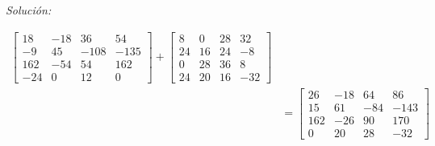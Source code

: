 \documentclass[12pt]{article}
\newenvironment{sol}
    {\emph{Solución:}
    }
    {
    }
\begin{document}
\begin{sol}
\begin{align*}
\begin{bmatrix}
18 & -18 & 36 & 54 \\
-9 & 45 & -108 & -135 \\
162 & -54 & 54 & 162 \\
-24 & 0 & 12 & 0
\end{bmatrix}
+
\begin{bmatrix}
8 & 0 & 28 & 32 \\
24 & 16 & 24 & -8 \\
0 & 28 & 36 & 8 \\
24 & 20 & 16 & -32
\end{bmatrix} \\
&= \begin{bmatrix}
26 & -18 & 64 & 86 \\
15 & 61 & -84 & -143 \\
162 & -26 & 90 & 170 \\
0 & 20 & 28 & -32
\end{bmatrix}
\end{align*}


\end{sol}
\end{document}
